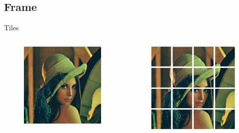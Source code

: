 \documentclass[slidetop,compress,mathserif]{beamer}
\begin{document}
	\subsection{Frame}
	\begin{frame}{Tiles}
		\begin{columns}
			\begin{column}{0.5\textwidth}
				\begin{figure}[h]
					\includegraphics[width=\textwidth]{images/Lenna-green}
				\end{figure}
			\end{column}
			\begin{column}{0.5\textwidth}
				\pause
				\begin{figure}[h]
					\includegraphics[width=\textwidth]{images/Lenna-green-grid}

\end{figure}
\end{column}
\end{columns}
\end{frame}
\end{document}
